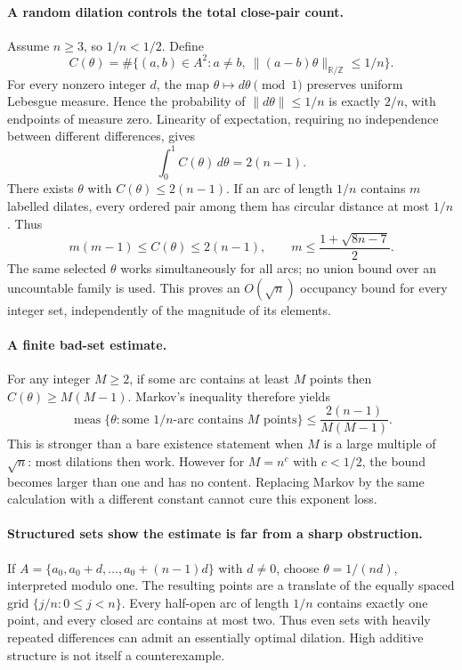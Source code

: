 \documentclass[11pt,a4paper]{article}
\newcommand{\Z}{\mathbb{Z}}
\newcommand{\R}{\mathbb{R}}
\begin{document}
\paragraph{A random dilation controls the total close-pair count.}
Assume $n\geq3$, so $1/n<1/2$. Define
\[
 C(\theta)=\#\{(a,b)\in A^2:a\ne b,\ \|(a-b)\theta\|_{\R/\Z}\leq1/n\}.
\]
For every nonzero integer $d$, the map $\theta\mapsto d\theta\pmod1$ preserves uniform Lebesgue measure. Hence the probability of $\|d\theta\|\leq1/n$ is exactly $2/n$, with endpoints of measure zero. Linearity of expectation, requiring no independence between different differences, gives
\[
 \int_0^1C(\theta)\,d\theta=2(n-1).
\]
There exists $\theta$ with $C(\theta)\leq2(n-1)$. If an arc of length $1/n$ contains $m$ labelled dilates, every ordered pair among them has circular distance at most $1/n$. Thus
\[
 m(m-1)\leq C(\theta)\leq2(n-1),\qquad
 m\leq\frac{1+\sqrt{8n-7}}2.
\]
The same selected $\theta$ works simultaneously for all arcs; no union bound over an uncountable family is used. This proves an $O(\sqrt n)$ occupancy bound for every integer set, independently of the magnitude of its elements.

\paragraph{A finite bad-set estimate.}
For any integer $M\geq2$, if some arc contains at least $M$ points then $C(\theta)\geq M(M-1)$. Markov's inequality therefore yields
\[
 \operatorname{meas}\{\theta:\text{some }1/n\text{-arc contains }M\text{ points}\}
 \leq\frac{2(n-1)}{M(M-1)}.
\]
This is stronger than a bare existence statement when $M$ is a large multiple of $\sqrt n$: most dilations then work. However for $M=n^c$ with $c<1/2$, the bound becomes larger than one and has no content. Replacing Markov by the same calculation with a different constant cannot cure this exponent loss.

\paragraph{Structured sets show the estimate is far from a sharp obstruction.}
If $A=\{a_0,a_0+d,\ldots,a_0+(n-1)d\}$ with $d\ne0$, choose $\theta=1/(nd)$, interpreted modulo one. The resulting points are a translate of the equally spaced grid $\{j/n:0\leq j<n\}$. Every half-open arc of length $1/n$ contains exactly one point, and every closed arc contains at most two. Thus even sets with heavily repeated differences can admit an essentially optimal dilation. High additive structure is not itself a counterexample.
\end{document}
